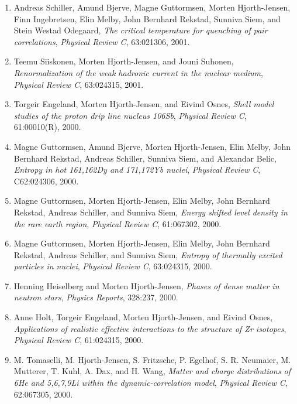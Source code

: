 \documentclass[a4wide,10pt]{article}
\begin{document}
\begin{enumerate}
\item Andreas Schiller, Amund Bjerve, Magne Guttormsen, Morten Hjorth-Jensen, Finn   Ingebretsen, Elin Melby, John Bernhard Rekstad, Sunniva Siem, and   Stein Westad Odegaard, \emph{The critical temperature for quenching of pair correlations},  \emph{Physical Review C}, 63:021306, 2001. 

\item Teemu Siiskonen, Morten Hjorth-Jensen, and Jouni Suhonen, \emph{Renormalization of the weak hadronic current in the nuclear medium},  \emph{Physical Review C}, 63:024315, 2001. 

\item Torgeir Engeland, Morten Hjorth-Jensen, and Eivind Osnes, \emph{Shell model studies of the proton drip line nucleus 106Sb},  \emph{Physical Review C}, 61:00010(R), 2000. 

\item Magne Guttormsen, Amund Bjerve, Morten Hjorth-Jensen, Elin Melby, John Bernhard   Rekstad, Andreas Schiller, Sunniva Siem, and Alexandar Belic, \emph{Entropy in hot 161,162Dy and 171,172Yb nuclei},  \emph{Physical Review C}, C62:024306, 2000. 

\item Magne Guttormsen, Morten Hjorth-Jensen, Elin Melby, John Bernhard Rekstad,   Andreas Schiller, and Sunniva Siem, \emph{Energy shifted level density in the rare earth region}, \emph{Physical Review C}, 61:067302, 2000. 

\item Magne Guttormsen, Morten Hjorth-Jensen, Elin Melby, John Bernhard Rekstad,   Andreas Schiller, and Sunniva Siem, \emph{Entropy of thermally excited particles in nuclei},  \emph{Physical Review C}, 63:024315, 2000. 

\item Henning Heiselberg and Morten Hjorth-Jensen, \emph{Phases of dense matter in neutron stars},  \emph{Physics Reports}, 328:237, 2000. 

\item Anne Holt, Torgeir Engeland, Morten Hjorth-Jensen, and Eivind Osnes, \emph{Applications of realistic effective interactions to the structure of Zr isotopes},  \emph{Physical Review C}, 61:024315, 2000. 

\item M. Tomaselli, M. Hjorth-Jensen, S. Fritzsche, P. Egelhof, S. R. Neumaier,   M. Mutterer, T. Kuhl, A. Dax, and H. Wang, \emph{Matter and charge distributions of 6He and 5,6,7,9Li   within the dynamic-correlation model},  \emph{Physical Review C}, 62:067305, 2000. 


\end{enumerate}
\end{document}
